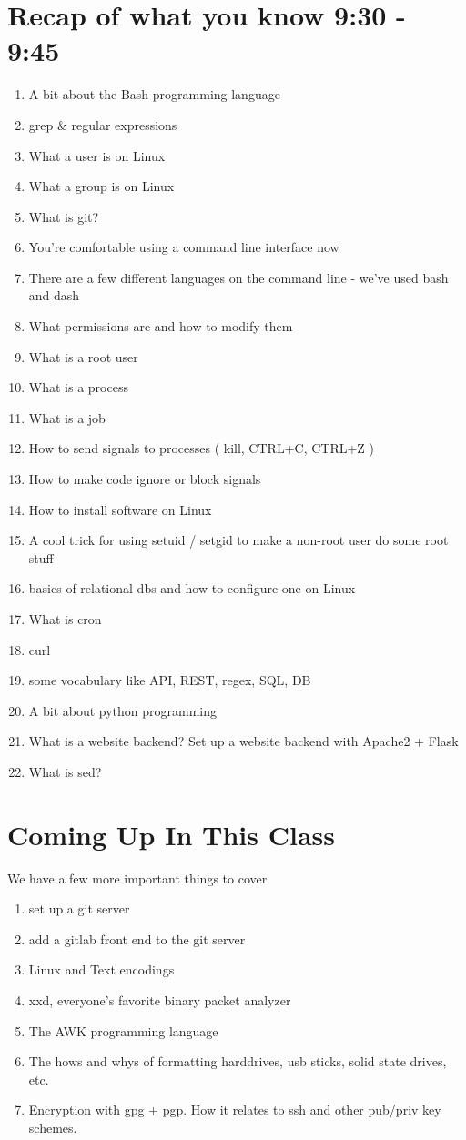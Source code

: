 \documentclass[10pt]{article}
\begin{document}
\section{Recap of what you know 9:30 - 9:45}
\begin{enumerate}
\item A bit about the Bash programming language
\item grep \& regular expressions
\item What a user is on Linux
\item What a group is on Linux
\item What is git?
\item You're comfortable using a command line interface now
\item There are a few different languages on the command line - we've used bash and dash
\item What permissions are and how to modify them
\item What is a root user
\item What is a process
\item What is a job
\item How to send signals to processes ( kill, CTRL+C, CTRL+Z )
\item How to make code ignore or block signals
\item How to install software on Linux
\item A cool trick for using setuid / setgid to make a non-root user do some root stuff
\item basics of relational dbs and how to configure one on Linux
\item What is cron
\item curl
\item some vocabulary like API, REST, regex, SQL, DB
\item A bit about python programming
\item What is a website backend? Set up a website backend with Apache2 + Flask
\item What is sed?
\end{enumerate}

\section{Coming Up In This Class}

We have a few more important things to cover
\begin{enumerate}
\item set up a git server
\item add a gitlab front end to the git server
\item Linux and Text encodings
\item xxd, everyone's favorite binary packet analyzer
\item The AWK programming language
\item The hows and whys of formatting harddrives, usb sticks, solid state drives, etc.
\item Encryption with gpg + pgp. How it relates to ssh and other pub/priv key schemes.
\end{enumerate}
\end{document}
